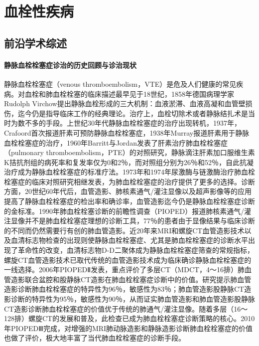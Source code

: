\chapter{血栓性疾病}

\section{前沿学术综述}

\subsubsection{静脉血栓栓塞症诊治的历史回顾与诊治现状}

静脉血栓栓塞症（venous
thromboembolism，VTE）是危及人们健康的常见疾病。对血栓和肺血栓栓塞的临床描述最早见于18世纪，1858年德国病理学家Rudolph
Virchow提出静脉血栓形成的三大机制：血液淤滞、血液高凝和血管壁损伤，迄今仍是指导临床工作的经典理论。治疗上，血栓切除术或者静脉结扎术是当时为数不多的手段。上世纪30年代静脉血栓栓塞症的治疗出现转机，1937年，Crafoord首次报道肝素可预防静脉血栓栓塞症，1938年Murray报道肝素用于静脉血栓栓塞症的治疗，1960年Barritt与Jordan发表了肝素治疗肺血栓栓塞症（pulmonary
thromboembolism，PTE）的对照研究，静脉滴注肝素加口服维生素K拮抗剂组的病死率和复发率仅为0和2％，而对照组分别为26％和52％，自此抗凝治疗成为静脉血栓栓塞症的标准疗法。1973年和1974年尿激酶与链激酶治疗肺血栓栓塞症的临床对照研究相继发表，为肺血栓栓塞症的治疗提供了更多的选择。诊断方面，20世纪60年代后，血管造影、肺核素通气/灌注显像以及超声影像等的应用提高了静脉血栓栓塞症的检出率和确诊率，血管造影迄今仍是静脉血栓栓塞症诊断的金标准。1990年肺血栓栓塞诊断的前瞻性调查（PIOPED）报道肺核素通气/灌注显像并不是肺血栓栓塞症理想的诊断工具，77％的患者由于显像结果与临床诊断的不同而仍然需要行有创的肺血管造影。近20年来MRI和螺旋CT血管造影技术以及血清标志物检查的出现则使静脉血栓栓塞症、尤其是肺血栓栓塞症的诊断水平出现了革命性的改变，血清标志物D-D二聚体成为静脉血栓栓塞症筛查的常规指标，螺旋CT血管造影技术已取代传统的血管造影技术成为临床确诊静脉血栓栓塞症的一线选择。2006年PIOPEDⅡ发表，重点评价了多层CT（MDCT，4～16排）肺血管造影联合盆腔和股静脉CT造影在肺血栓栓塞症诊断中的价值。研究提示肺血管造影诊断肺血栓栓塞症的特异性为96％，敏感性为83％；肺血管造影股静脉CT造影诊断的特异性为95％，敏感性为90％，从而证实肺血管造影和肺血管造影股静脉CT造影诊断肺血栓栓塞症的价值优于传统的肺通气/灌注显像。随着多层（16～128排）螺旋CT的发展和普及，此检查已成为肺血栓栓塞症诊断策略的核心。2010年PIOPEDⅢ完成，对增强的MRI肺动脉造影和静脉造影诊断肺血栓栓塞症的价值也做了评价，极大地丰富了当代肺血栓栓塞症的诊断手段。

